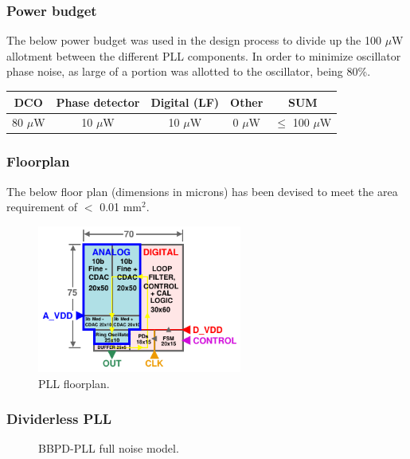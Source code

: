 	\subsubsection{Power budget}
	The below power budget was used in the design process to divide up the 100 $\mu$W allotment between the different PLL components. In order to minimize oscillator phase noise, as large of a portion was allotted to the oscillator, being 80\%. 
		\begin{table}[htb!]
			\centering
			\def\arraystretch{1.5}		
			\setlength\arrayrulewidth{0.75pt}
			\setlength{\tabcolsep}{1em} %
			\begin{tabular}{|c|c|c|c|c|}
				\hline 
				\rule[-1ex]{0pt}{2.5ex} \cellcolor{gray!40}\textbf{DCO} & \cellcolor{gray!40}\textbf{Phase detector} & \cellcolor{gray!40}\textbf{Digital (LF)}& \cellcolor{gray!40}\textbf{Other} & \cellcolor{gray!40}\textbf{SUM} \\ 
				\hline 
				\rule[-1ex]{0pt}{2.5ex} 80 $\mu$W& 10 $\mu$W &  10 $\mu$W  & 0 $ \mu$W & $\leq$ 100  $\mu$W\\ 
				\hline 
			\end{tabular} 
		\end{table}   



	\subsubsection{Floorplan}
	The below floor plan (dimensions in microns) has been devised to meet the area requirement of $<$ 0.01 mm$^2$.
		\begin{figure}[htb!]
	        \centering
	        \includegraphics[width=0.6\textwidth, angle=0]{./figs/pll_floorplan2}
		    \caption{PLL floorplan.}
		\end{figure}

\subsubsection{Dividerless PLL}
\vspace{-2em}
\begin{figure}[htb!]
	\center
	\caption{BBPD-PLL full noise model.}
	\label{fig:bbpll_full_noise}
\end{figure}

